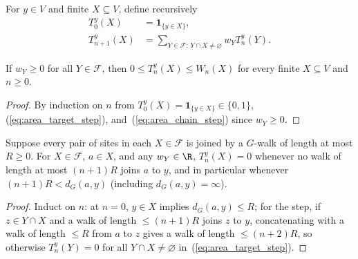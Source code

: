 \begin{definition}
    \label{def:area_target_chain}
    \leanok
    For $y\in V$ and finite $X\subseteq V$, define recursively
    \begin{align}
        T_0^y(X)     & =\mathbf1_{\{y\in X\}},
        \label{eq:area_target_initial}         \\
        T_{n+1}^y(X) & =
        \sum_{Y\in\mathcal F:\,Y\cap X\ne\varnothing}w_YT_n^y(Y).
        \label{eq:area_target_step}
    \end{align}
\end{definition}

\begin{lemma}
    \label{thm:area_target_domination}
    \leanok
    If $w_Y\ge0$ for all $Y\in\mathcal F$, then $0\le T_n^y(X)\le W_n(X)$ for
    every finite $X\subseteq V$ and $n\ge0$.
\end{lemma}
\begin{proof}
    \leanok
    By induction on $n$ from $T_0^y(X)=\mathbf1_{\{y\in X\}}\in\{0,1\}$,
    (\ref{eq:area_target_step}), and~(\ref{eq:area_chain_step}) since
    $w_Y\ge0$.
\end{proof}

\begin{lemma}
    \label{thm:area_target_zero}
    \leanok
    Suppose every pair of sites in each $X\in\mathcal F$ is joined by a
    $G$-walk of length at most $R\ge0$. For $X\in\mathcal F$, $a\in X$, and
    any $w_Y\in\R$, $T_n^y(X)=0$ whenever no walk of length at most $(n+1)R$
    joins $a$ to $y$, and in particular whenever $(n+1)R<d_G(a,y)$ (including
    $d_G(a,y)=\infty$).
\end{lemma}
\begin{proof}
    \leanok
    Induct on $n$: at $n=0$, $y\in X$ implies $d_G(a,y)\le R$; for the step,
    if $z\in Y\cap X$ and a walk of length $\le(n+1)R$ joins $z$ to $y$,
    concatenating with a walk of length $\le R$ from $a$ to $z$ gives a walk of
    length $\le(n+2)R$, so otherwise $T_n^y(Y)=0$ for all $Y\cap X\ne\varnothing$
    in~(\ref{eq:area_target_step}).
\end{proof}

